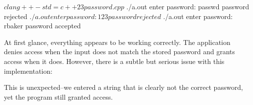 \documentclass[12pt]{article}
\begin{document}
\begin{terminal}
$ clang++ -std=c++23 password.cpp
$ ./a.out
enter password: passwd
password rejected
$ ./a.out
enter password: 123
password rejected
$ ./a.out
enter password: rbaker
password accepted
\end{terminal}

\noindent
At first glance, everything appears to be working correctly.
The application denies access when the input does not match the stored password and grants access when it does.
However, there is a subtle but serious issue with this implementation:


\nointent
This is unexpected--we entered a string that is clearly not the correct password, yet the program still granted access.
\end{document}

